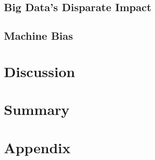 \documentclass{article}
\begin{document}
\subsection{Big Data’s Disparate Impact}


\subsection{Machine Bias}


\section{Discussion}


\section{Summary}


\newpage
\section{Appendix}


\medskip
\small


\end{document}
